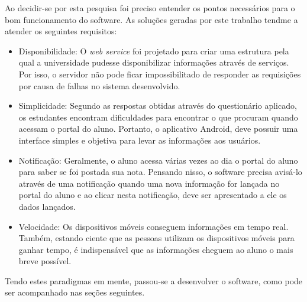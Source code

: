 	\par Ao decidir-se por esta pesquisa foi preciso entender os pontos
necessários para o bom funcionamento do software. As soluções geradas por este
trabalho tendme a atender os seguintes requisitos:

	\begin{itemize}
		\item Disponibilidade: O \textit{web service} foi projetado para criar uma
		estrutura pela qual a universidade pudesse disponibilizar informações através
		de serviços. Por isso, o servidor não pode ficar impossibilitado de responder
		as requisições por causa de falhas no sistema desenvolvido.
		\item Simplicidade: Segundo as respostas obtidas através do questionário
		aplicado, os estudantes encontram dificuldades para encontrar o que procuram
		quando acessam o portal do aluno. Portanto, o aplicativo Android, deve possuir
		uma interface simples e objetiva para levar as informações aos usuários.
		\item Notificação: Geralmente, o aluno acessa várias vezes ao dia o portal do
		aluno para saber se foi postada sua nota. Pensando nisso, o software precisa
		avisá-lo através de uma notificação quando uma nova informação for lançada no
		portal do aluno e ao clicar nesta notificação, deve ser apresentado a ele os
		dados lançados.
		\item Velocidade: Os dispositivos móveis conseguem informações em tempo real.
		Também, estando ciente que as pessoas utilizam os dispositivos móveis para
		ganhar tempo, é indispensável que as informações cheguem ao aluno o mais breve
		possível.
	\end{itemize}

	\par Tendo estes paradigmas em mente, passou-se a desenvolver o software, como
pode ser acompanhado nas seções seguintes.
